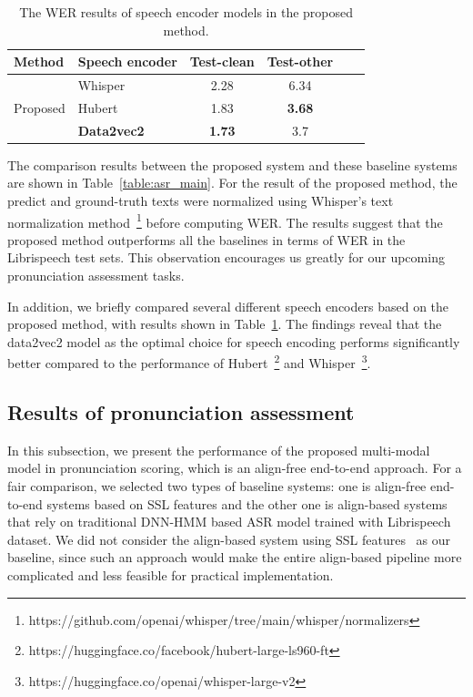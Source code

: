\begin{table}[ht]
  \centering
  \caption{The WER results of speech encoder models in the proposed method.}
   \label{table:asr1}
\begin{tabular}{clcccc}
\toprule
      \multicolumn{1}{l}{\textbf{Method}}   & \textbf{Speech encoder}  & \textbf{Test-clean} & \textbf{Test-other}   \\  
   \midrule
   \multirow{3}{*}{Proposed}  &  Whisper        & 2.28              & 6.34                 \\
                              &  Hubert       & 1.83             &  \textbf{3.68}                \\ 
                              &  \textbf{Data2vec2}      & \textbf{1.73}              & 3.7                 \\ 
                              
\bottomrule
\end{tabular}
\end{table}


The comparison results between the proposed system and these baseline systems are shown in Table~\ref{table:asr_main}. For the result of the proposed method, the predict and ground-truth texts were normalized using Whisper's text normalization method~\footnote{\scriptsize{https://github.com/openai/whisper/tree/main/whisper/normalizers}} before computing WER. The results suggest that the proposed method outperforms all the baselines in terms of WER in the Librispeech test sets. This observation encourages us greatly for our upcoming pronunciation assessment tasks.

In addition, we briefly compared several different speech encoders based on the proposed method, with results shown in Table~\ref{table:asr1}. The findings reveal that the data2vec2 model as the optimal choice for speech encoding performs significantly better compared to the performance of Hubert~\footnote{\scriptsize{https://huggingface.co/facebook/hubert-large-ls960-ft}} and Whisper~\footnote{\scriptsize{https://huggingface.co/openai/whisper-large-v2}}.



\subsection{Results of pronunciation assessment}
In this subsection, we present the performance of the proposed multi-modal model in pronunciation scoring, which is an align-free end-to-end approach. For a fair comparison, we selected two types of baseline systems: one is align-free end-to-end systems based on SSL features and the other one is align-based systems that rely on traditional DNN-HMM based ASR model trained with Librispeech dataset. We did not consider the align-based system using SSL features~\cite{3m} as our baseline, since such an approach would make the entire align-based pipeline more complicated and less feasible for practical implementation.


